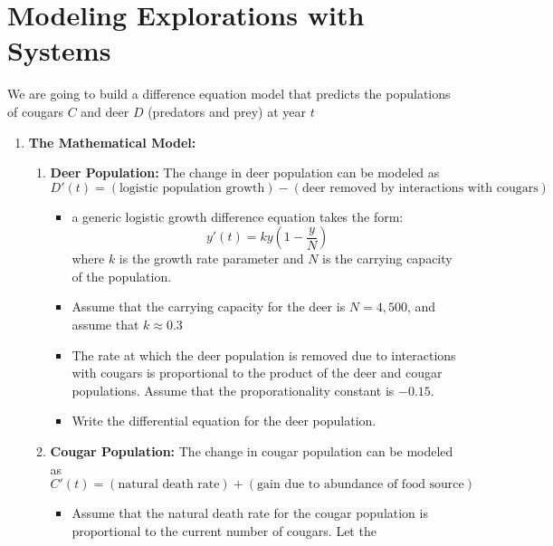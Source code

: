 \newpage\section{Modeling Explorations with Systems}
\begin{problem}
We are going to build a difference equation model that predicts the populations of cougars
$C$ and deer $D$ (predators and prey) at year $t$
\begin{enumerate}
    \item {\bf The Mathematical Model:} 
        \begin{enumerate}
            \item {\bf Deer Population:} The change in deer population can be modeled as 
                \[ D'(t) = (\text{logistic population growth}) - (\text{deer removed
                by interactions with cougars}) \]
                \begin{itemize}
                    \item a generic logistic growth difference equation takes the form: 
                        \[ y'(t) = k y \left(1-\frac{y}{N}\right) \]
                        where $k$ is the growth rate parameter and
                        $N$ is the carrying capacity of the population.
                    \item Assume that the carrying capacity for the deer is $N = 4,500$,
                        and assume that $k \approx 0.3$
                    \item The rate at which the deer population is removed due to
                        interactions with cougars is proportional to the product of the
                        deer and cougar populations.  Assume that the proporationality
                        constant is $-0.15$.
                    \item Write the differential equation for the deer population. 
                \end{itemize}
            \item {\bf Cougar Population:} The change in cougar population can be modeled
                as
                \[ C'(t) = \left( \text{natural death rate} \right) + \left(
                    \text{gain due to abundance of food source}
                \right) \]
                \begin{itemize}
                    \item Assume that the natural death rate for the cougar population is
                        proportional to the current number of cougars.  Let the

\end{itemize}
\end{enumerate}
\end{enumerate}
\end{problem}
